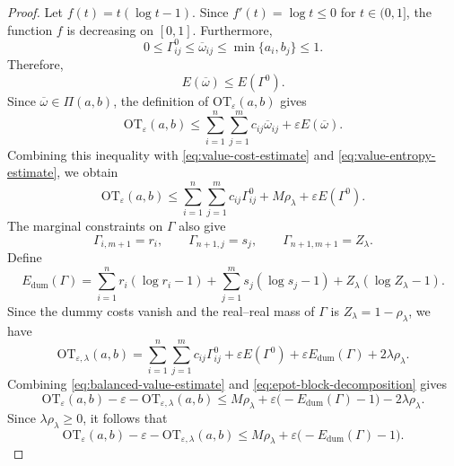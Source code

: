 \documentclass[10pt,a4paper]{amsart}
\newcommand{\OT}{\mathrm{OT}}
\newcommand{\eps}{\varepsilon}
\begin{document}
\begin{proof}
Let $f(t)=t(\log t-1)$. Since $f'(t)=\log t\leq0$ for $t\in(0,1]$, the function $f$ is decreasing on $[0,1]$. Furthermore,
\begin{equation*}
  0\leq\Gamma^0_{ij}\leq\overline\omega_{ij}\leq\min\{a_i,b_j\}\leq1.
\end{equation*}
Therefore,
\begin{equation}\label{eq:value-entropy-estimate}
  E(\overline\omega) \leq E(\Gamma^0).
\end{equation}
Since $\overline\omega\in\Pi(a,b)$, the definition of $\OT_{\eps}(a,b)$ gives
\begin{equation*}
  \OT_{\eps}(a,b) \leq \sum_{i = 1}^{n}\sum_{j = 1}^{m}c_{ij}\overline\omega_{ij} + \eps E(\overline\omega).
\end{equation*}
Combining this inequality with \eqref{eq:value-cost-estimate} and \eqref{eq:value-entropy-estimate}, we obtain
\begin{equation}\label{eq:balanced-value-estimate}
  \OT_{\eps}(a,b) \leq \sum_{i = 1}^{n}\sum_{j = 1}^{m}c_{ij}\Gamma^0_{ij} + M\rho_{\lambda} + \eps E(\Gamma^0).
\end{equation}
The marginal constraints on $\Gamma$ also give
\begin{equation*}
  \Gamma_{i,m+1}=r_i,\qquad \Gamma_{n+1,j}=s_j,\qquad \Gamma_{n+1,m+1}=Z_{\lambda}.
\end{equation*}
Define
\begin{equation*}
  E_{\mathrm{dum}}(\Gamma) = \sum_{i = 1}^{n}r_i(\log r_i-1) + \sum_{j = 1}^{m}s_j(\log s_j-1) + Z_{\lambda}(\log Z_{\lambda}-1).
\end{equation*}
Since the dummy costs vanish and the real--real mass of $\Gamma$ is $Z_{\lambda}=1-\rho_{\lambda}$, we have
\begin{equation}\label{eq:epot-block-decomposition}
  \OT_{\eps,\lambda}(a,b) = \sum_{i = 1}^{n}\sum_{j = 1}^{m}c_{ij}\Gamma^0_{ij} + \eps E(\Gamma^0) + \eps E_{\mathrm{dum}}(\Gamma) + 2\lambda\rho_{\lambda}.
\end{equation}
Combining \eqref{eq:balanced-value-estimate} and \eqref{eq:epot-block-decomposition} gives
\begin{equation*}
  \OT_{\eps}(a,b)-\eps-\OT_{\eps,\lambda}(a,b) \leq M\rho_{\lambda} + \eps\bigl(-E_{\mathrm{dum}}(\Gamma)-1\bigr) - 2\lambda\rho_{\lambda}.
\end{equation*}
Since $\lambda\rho_{\lambda}\geq0$, it follows that
\begin{equation}\label{eq:value-gap-entropy}
  \OT_{\eps}(a,b)-\eps-\OT_{\eps,\lambda}(a,b) \leq M\rho_{\lambda} + \eps\bigl(-E_{\mathrm{dum}}(\Gamma)-1\bigr).

\end{equation}
\end{proof}
\end{document}
